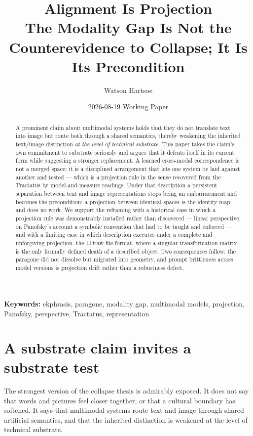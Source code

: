 \documentclass[11pt,a4paper]{article}
\title{\textbf{Alignment Is Projection}\\[.35em]\large The Modality Gap Is Not the Counterevidence to Collapse; It Is Its Precondition}
\author{Watson Hartsoe}
\date{2026-08-19 \quad\textemdash\quad Working Paper}
\begin{document}
\maketitle
\begin{abstract}\noindent A prominent claim about multimodal systems holds that they do not translate text into image but route both through a shared semantics, thereby weakening the inherited text/image distinction \emph{at the level of technical substrate}. This paper takes the claim's own commitment to substrate seriously and argues that it defeats itself in its current form while suggesting a stronger replacement. A learned cross-modal correspondence is not a merged space; it is a disciplined arrangement that lets one system be laid against another and tested --- which is a projection rule in the sense recovered from the Tractatus by model-and-measure readings. Under that description a persistent separation between text and image representations stops being an embarrassment and becomes the precondition: a projection between identical spaces is the identity map and does no work. We support the reframing with a historical case in which a projection rule was demonstrably installed rather than discovered --- linear perspective, on Panofsky's account a symbolic convention that had to be taught and enforced --- and with a limiting case in which description executes under a complete and unforgiving projection, the LDraw file format, where a singular transformation matrix is the only formally defined death of a described object. Two consequences follow: the paragone did not dissolve but migrated into geometry, and prompt brittleness across model versions is projection drift rather than a robustness defect.\end{abstract}
\vspace{-.5em}\noindent\textbf{Keywords:} ekphrasis, paragone, modality gap, multimodal models, projection, Panofsky, perspective, Tractatus, representation\par\vspace{1em}
\section{A substrate claim invites a substrate test}
The strongest version of the collapse thesis is admirably exposed. It does not say that words and pictures feel closer together, or that a cultural boundary has softened. It says that multimodal systems route text and image through shared artificial semantics, and that the inherited distinction is weakened at the level of technical substrate.
\end{document}
